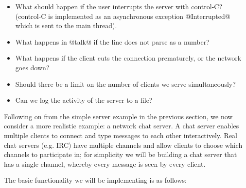 \begin{itemize}
\item What should happen if the user interrupts the server with
  control-C? (control-C is implemented as an asynchronous exception
  @Interrupted@ which is sent to the main thread).
\item What happens in @talk@ if the line does not parse as a number?
\item What happens if the client cuts the connection prematurely, or
  the network goes down?
\item Should there be a limit on the number of clients we serve
  simultaneously?
\item Can we log the activity of the server to a file?
\end{itemize}


Following on from the simple server example in the previous section,
we now consider a more realistic example: a network chat server.  A
chat server enables multiple clients to connect and type messages to
each other interactively.  Real chat servers (e.g. IRC) have multiple
channels and allow clients to choose which channels to participate in;
for simplicity we will be building a chat server that has a single
channel, whereby every message is seen by every client.

The basic functionality we will be implementing is as follows:

